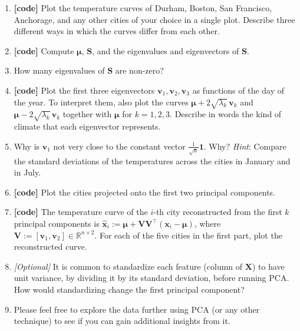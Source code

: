 \documentclass[letterpaper]{article}
\newcommand{\Real}{\mathbb{R}}
\newcommand{\tr}{^\top}
\begin{document}
\begin{enumerate}
\item \textbf{[code]} Plot the temperature curves of Durham, Boston, San Francisco, Anchorage, and any other cities of your choice in a single plot. Describe three different ways in which the curves differ from each other.
\item \textbf{[code]} Compute $\bm{\mu}$, $\bm{S}$, and the eigenvalues and eigenvectors of $\bm{S}$. 
\item How many eigenvalues of $\bm{S}$ are non-zero? 
\item \textbf{[code]} Plot the first three eigenvectors $\bm{v}_1, \bm{v}_2, \bm{v}_3$ as functions of the day of the year. To interpret them, also plot the curves $\bm{\mu} + 2 \sqrt{\lambda_k}\, \bm{v}_k$ and $\bm{\mu} - 2 \sqrt{\lambda_k}\, \bm{v}_k$ together with $\bm{\mu}$ for $k = 1,2,3$. Describe in words the kind of climate that each eigenvector represents. 
\item Why is $\bm{v}_1$ not very close to the constant vector $\frac{1}{\sqrt{n}}\bm{1}$. Why? \emph{Hint}: Compare the standard deviations of the temperatures across the cities in January and in July.
\item \textbf{[code]} Plot the cities projected onto the first two principal components. 
\item \textbf{[code]} The temperature curve of the $i$-th city reconstructed from the first $k$ principal components is $\hat{\bm{x}}_i := \bm{\mu} + \bm{V} \bm{V}\tr (\bm{x}_i - \bm{\mu})$, where $\bm{V} := [\bm{v}_1, \bm{v}_2] \in \Real^{n \times 2}$. For each of the five cities in the first part, plot the reconstructed curve. 
\item \emph{[Optional]} It is common to standardize each feature (column of $\bm{X}$) to have unit variance, by dividing it by its standard deviation, before running PCA. How would standardizing change the first principal component?
\item Please feel free to explore the data further using PCA (or any other technique) to see if you can gain additional insights from it. 
\end{enumerate}
\end{document}
